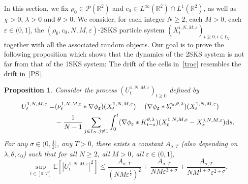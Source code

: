 \documentclass[11pt]{article}
\newtheorem{proposition}[theorem]{Proposition}
\newcommand{\E}{\mathbb{E}}
\newcommand{\R}{\mathbb{R}}
\newcommand{\1}{\mathbbm{1}}
\newcommand{\dd}{{\rm d}}
\newcommand{\Pp}{\mathcal P}
\newcommand{\e}{\varepsilon}
\begin{document}
In this section, we fix $\rho_0 \in \Pp(\R^2)$ and $c_0 \in L^\infty(\R^2)\cap L^1(\R^2)$,
as well as $\chi>0$, $\lambda>0$ and $\theta>0$. We consider, for each integer $N\geq 2$, each $M>0$, 
each $\e\in (0,1]$, the $(\rho_0,c_0,N,M,\e)$-2SKS particle system $(X^{i,N,M,\e}_t)_{t\geq 0, i \in I_N}$
together with all the associated random objects.
Our goal is to prove the following proposition which shows that
the dynamics of the 2SKS system is not far from that of the 1SKS system: The drift of the cells in~\eqref{troc}
resembles the drift in~\eqref{PS}.

\begin{proposition}\label{prel}
Consider the process $(U^{1,N,M,\e}_t)_{t\geq 0}$ defined by
\begin{align*}
U^{1,N,M,\e}_t=&(\nu^{1,N,M,\e}_t\ast \nabla \phi_{\e})(X^{1,N,M,\e}_t)-(\nabla \phi_{\e}\ast b^{c_0,\theta,\lambda}_t)(X^{1,N,M,\e}_t)\\
&-\frac1{N-1} \sum_{j \in I_N,j\neq 1}\int_0^t (\nabla \phi_\e\ast K^{\theta,\lambda}_{t-s})(X^{1,N,M,\e}_t-X^{j,N,M,\e}_s)\dd s.
\end{align*}
For any $\sigma\in (0,\frac12]$, any $T>0$, there exists a constant
$A_{\sigma,T}$ (also depending on $\lambda,\theta,c_0$) such that for all $N\geq 2$, all $M>0$, all $\e\in (0,1]$,
$$
\sup_{t\in [0,T]}\E[|U^{1,N,M,\e}_t|^2] \leq \frac{A_{\sigma,T}}{(NM \e^{\frac12})^{2}}
+\frac{A_{\sigma,T}}{NM \e^{3+\sigma}}+\frac{A_{\sigma,T}}{NM^{1+\sigma}\e^{2+\sigma}}.
$$
\end{proposition}
\end{document}
